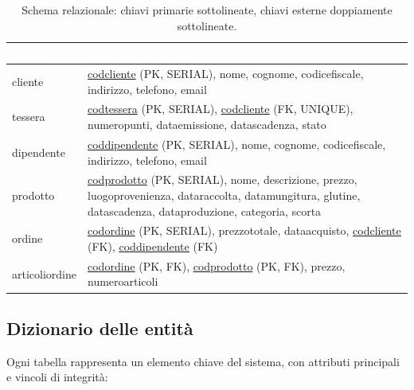\documentclass[a4paper,12pt]{article}
\renewcommand{\arraystretch}{1.2} %
\begin{document}
\vspace{0.5em}
\renewcommand{\arraystretch}{1.35}
\begin{table}[ht]
\centering
\setlength{\tabcolsep}{8pt}
\begin{tabular}{|>{\centering\arraybackslash}m{3.5cm}|>{\raggedright\arraybackslash}m{10.5cm}|}
\hline
\rowcolor{myblue}\textcolor{white}{\textbf{Tabella}} & \textcolor{white}{\textbf{Attributi principali}} \\
\hline
\rowcolor{mygray} cliente & \underline{codcliente} (PK, SERIAL), nome, cognome, codicefiscale, indirizzo, telefono, email \\
tessera & \underline{codtessera} (PK, SERIAL), \underline{\underline{codcliente}} (FK, UNIQUE), numeropunti, dataemissione, datascadenza, stato \\
\rowcolor{mygray} dipendente & \underline{coddipendente} (PK, SERIAL), nome, cognome, codicefiscale, indirizzo, telefono, email \\
prodotto & \underline{codprodotto} (PK, SERIAL), nome, descrizione, prezzo, luogoprovenienza, dataraccolta, datamungitura, glutine, datascadenza, dataproduzione, categoria, scorta \\
\rowcolor{mygray} ordine & \underline{codordine} (PK, SERIAL), prezzototale, dataacquisto, \underline{\underline{codcliente}} (FK), \underline{\underline{coddipendente}} (FK) \\
articoliordine & \underline{codordine} (PK, FK), \underline{codprodotto} (PK, FK), prezzo, numeroarticoli \\
\hline
\end{tabular}
\caption{Schema relazionale: chiavi primarie sottolineate, chiavi esterne doppiamente sottolineate.}
\end{table}

\subsection{Dizionario delle entità}

Ogni tabella rappresenta un elemento chiave del sistema, con attributi principali e vincoli di integrità:
\end{document}
